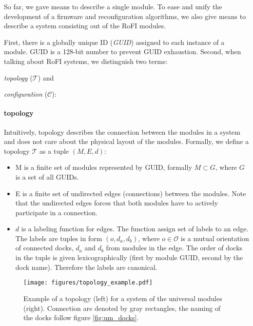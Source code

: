 So far, we gave means to describe a single module. To ease and unify the
development of a firmware and reconfiguration algorithms, we also give means to
describe a system consisting out of the RoFI modules.

First, there is a globally unique ID (\emph{GUID}) assigned to each instance of
a module. GUID is a 128-bit number to prevent GUID exhaustion. Second, when
talking about RoFI systems, we distinguish two terms:
\begin{enumerate*}
    \item \emph{topology} ($\mathcal{T}$) and
    \item \emph{configuration} ($\mathcal{C}$):
\end{enumerate*}

\paragraph{topology} Intuitively, topology describes the connection between the
modules in a system and does not care about the physical layout of the modules.
Formally, we define a topology $\mathcal{T}$ as a tuple $(M, E, d)$:
\begin{itemize}
    \item M is a finite set of modules represented by GUID, formally $M\subset
    G$, where $G$ is a set of all GUIDs.
    \item E is a finite set of undirected edges (connections) between the
    modules. Note that the undirected edges forces that both modules have to
    actively participate in a connection.
    \item $d$ is a labeling function for edges. The function assign set of
    labels to an edge. The labels are tuples in form $(o, d_a, d_b)$, where
    $o\in\mathcal{O}$ is a mutual orientation of connected docks, $d_a$ and
    $d_b$ from modules in the edge. The order of docks in the tuple is given
    lexicographically (first by module GUID, second by the dock name). Therefore
    the labels are canonical.
\end{itemize}

\begin{figure}[t]
    \centering
    \texttt{[image: figures/topology\_example.pdf]}
    \caption{Example of a topology (left) for a system of the universal modules
    (right). Connection are denoted by gray rectangles, the naming of the docks
    follow figure \ref{fig:um_docks}. }
    \label{fig:topology_example}
\end{figure}

